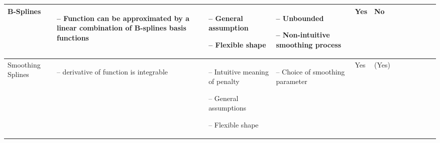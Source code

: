 \begin{table}[!ht]
\begin{tabular}{p{1.6cm}p{3.3cm}p{3.3cm}p{3.4cm}p{0.4cm}p{0.4cm}p{3cm}p{3cm}p{3cm}p{3cm}p{2.7cm}p{3cm}|}
		B-Splines                                                                                                                                          &
		\begin{cptitemize} \item[--]  Function can be approximated by a linear combination of B-splines basis functions               \end{cptitemize}               &
		\begin{cptitemize} \item[--]  General assumption \item[--]  Flexible shape                                                            \end{cptitemize}        &
		\begin{cptitemize} \item[--]  Unbounded \item[--]  Non-intuitive smoothing process                                                \end{cptitemize}        &
		Yes                                                                                                                                                            &
		No                                            \\ \hline%

		Smoothing Splines                                                                                                                                            &
		\begin{cptitemize} \item[--]  \nth{2} derivative of function is integrable                                                        \end{cptitemize}               &
		\begin{cptitemize} \item[--]  Intuitive meaning of penalty \item[--]  General assumptions \item[--]  Flexible shape                         \end{cptitemize} &
		\begin{cptitemize} \item[--]  Choice of smoothing parameter                                                                                       \end{cptitemize}               &
		Yes                                                                                                                                                          &
        (Yes) \\                                                                         


\end{tabular}
\end{table}
